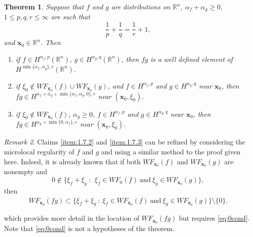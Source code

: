 \documentclass[a4paper,12pt]{amsart}
\numberwithin{equation}{section}
\theoremstyle{plain}
\newtheorem{theorem}{Theorem}
\numberwithin{theorem}{section}
\theoremstyle{definition}
\theoremstyle{remark}
\newtheorem{remark}[theorem]{Remark}
\theoremstyle{remark}
\theoremstyle{remark}
\newcommand{\vx}{{\mathbf{x}}}
\newcommand{\jc}[1]{\begin{quotation}\textbf{James' comment:\
}{\textit{#1}}\end{quotation}}
\begin{document}
\begin{theorem}\label{mainprod}
    Suppose that $f$ and $g$ are distributions on $\mathbb{R}^n$,  $\alpha_f + \alpha_g \geq 0$, $1 \leq p, q, r \leq \infty$ are such that
    \begin{equation}\label{eq:Young}
        \frac{1}{p} + \frac{1}{q} = \frac{1}{r} + 1,
    \end{equation}
    and $\vx_0 \in \mathbb{R}^n$. Then
    \begin{enumerate}
        \item
        \label{item:1.7.0}
        if $f \in H^{\alpha_f,p}(\mathbb{R}^n)$, $g \in H^{\alpha_g,q}(\mathbb{R}^n)$, then $fg$ is a well defined element of $H^{\min\{\alpha_f,\alpha_g\},r}(\mathbb{R}^n)$.
        \item \label{item:1.7.2} if $\xi_0 \notin WF_{\vx_0}(f) \cup WF_{\vx_0}(g)$, and $f \in H^{\alpha_f,p}$ and $g \in H^{\alpha_g,q}$ near $\vx_0$, then $fg \in H^{\alpha_f + \alpha_g + \min\{\alpha_f,\alpha_g,0\},r}$ near $(\vx_0,\xi_0)$.
        \item \label{item:1.7.3} if $\xi_0 \notin WF_{\vx_0}(f)$, $\alpha_g \geq 0$, $f \in H^{\alpha_f,p}$ and $g \in H^{\alpha_g,q}$ near $\vx_0$, then $fg \in H^{\alpha_g+\min\{0,\alpha_f\},r}$ near $(\vx_0,\xi_0)$.
    \end{enumerate}
\end{theorem}

\begin{remark}
    Claims \eqref{item:1.7.2} and \eqref{item:1.7.3} can be refined by considering the microlocal regularity of $f$ and $g$ and using a similar method to the proof given here. Indeed, it is already known \cite[Theorem 8.2.10]{hormanderI} that if both $WF_{\vx_0}(f)$ and $WF_{\vx_0}(g)$ are nonempty and
    \begin{equation} \label{eq:0cond}
    0 \notin \{ \xi_f + \xi_g \ : \ \ \xi_f \in WF_0(f) \ \mbox{and} \ \xi_g \in WF_{\vx_0}(g) \},
    \end{equation}
    then
    \[
    WF_{\vx_0}(fg) \subset \overline{\{\xi_f + \xi_g \ : \ \xi_f \in WF_{\vx_0}(f) \ \mbox{and} \ \xi_g \in WF_{\vx_0}(g)\}} \setminus\{0\}.
    \]

\noindent which provides more detail in the location of $WF_{\vx_0}(fg)$ but requires \eqref{eq:0cond}. Note that \eqref{eq:0cond} is not a hypotheses of the theorem.
\end{remark}
\end{document}
